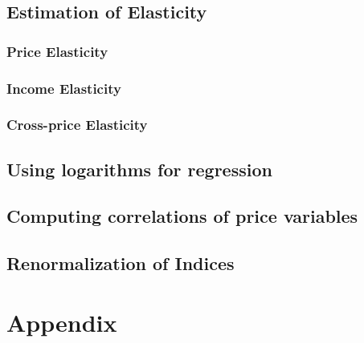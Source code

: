 \documentclass{article}
\begin{document}
\subsection{Estimation of Elasticity}
\subsubsection{Price Elasticity}
\subsubsection{Income Elasticity}
\subsubsection{Cross-price Elasticity}

\subsection{Using logarithms for regression}

\subsection{Computing correlations of price variables}

\subsection{Renormalization of Indices}




\section{Appendix}



\end{document}
